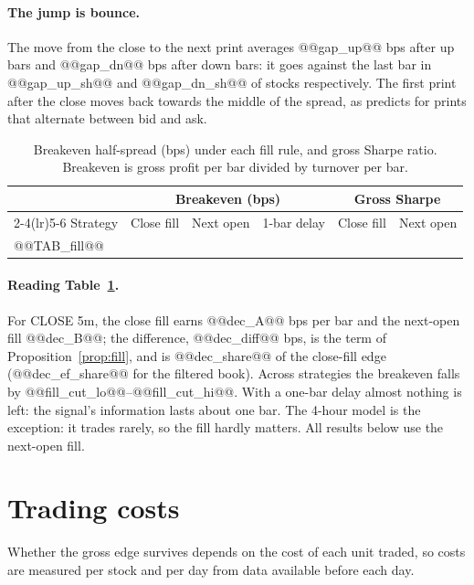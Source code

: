\documentclass[11pt,a4paper]{article}
\begin{document}
\paragraph{The jump is bounce.} The move from the close to the next print averages @@gap_up@@ bps after up
bars and @@gap_dn@@ bps after down bars: it goes against the last bar in @@gap_up_sh@@ and @@gap_dn_sh@@ of
stocks respectively. The
first print after the close moves back towards the middle of the spread, as \citet{roll1984} predicts
for prints that alternate between bid and ask.

\begin{table}[htbp]
\centering
\caption{Breakeven half-spread (bps) under each fill rule, and gross Sharpe ratio. Breakeven is gross
profit per bar divided by turnover per bar.}
\label{tab:fill}
\small
\begin{tabular}{@{}lrrrrr@{}}
\toprule
& \multicolumn{3}{c}{Breakeven (bps)} & \multicolumn{2}{c}{Gross Sharpe} \\
\cmidrule(lr){2-4}\cmidrule(lr){5-6}
Strategy & Close fill & Next open & 1-bar delay & Close fill & Next open \\
\midrule
@@TAB_fill@@
\bottomrule
\end{tabular}
\end{table}

\paragraph{Reading Table~\ref{tab:fill}.} For CLOSE 5m, the close fill earns @@dec_A@@ bps per bar and the
next-open fill @@dec_B@@; the difference, @@dec_diff@@ bps, is the term of Proposition~\ref{prop:fill}, and
is @@dec_share@@ of the close-fill edge (@@dec_ef_share@@ for the filtered book). Across strategies the
breakeven falls by @@fill_cut_lo@@--@@fill_cut_hi@@. With a one-bar delay almost nothing is left: the signal's
information lasts about one bar. The 4-hour model is the exception: it trades rarely, so the fill hardly
matters. All results below use the next-open fill.

\section{Trading costs}
\label{sec:costs}

Whether the gross edge survives depends on the cost of each unit traded, so costs are measured per stock and per day from data available before each day.
\end{document}
